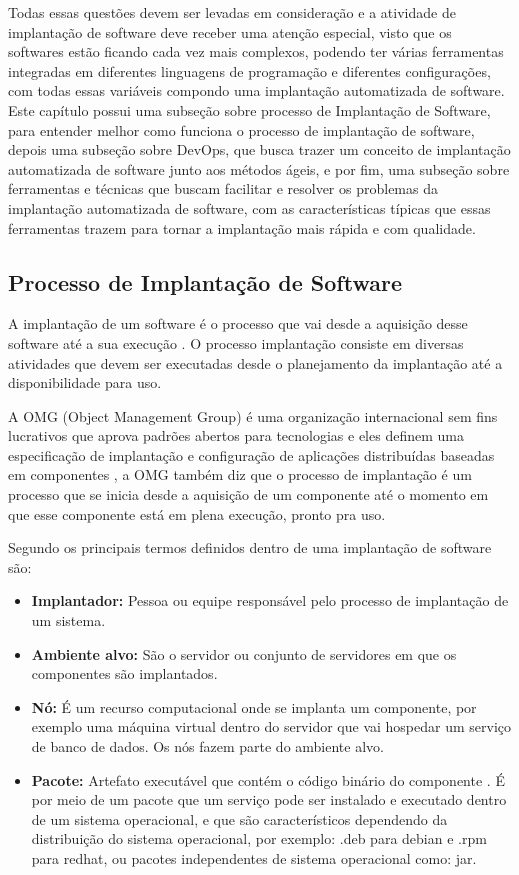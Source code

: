 Todas essas questões devem ser levadas em consideração e a atividade de implantação de
software deve receber uma atenção especial, visto que os softwares estão ficando
cada vez mais complexos, podendo ter várias ferramentas integradas em diferentes
linguagens de programação e diferentes configurações, com todas essas variáveis compondo
uma implantação automatizada de software. Este capítulo possui uma subseção sobre
processo de Implantação de Software, para entender melhor como funciona o processo de implantação
de software, depois uma subseção sobre DevOps, que busca trazer um conceito de implantação
automatizada de software junto aos métodos ágeis, e por fim, uma subseção sobre
ferramentas e técnicas que buscam facilitar e resolver os problemas da
implantação automatizada de software, com as características típicas que essas
ferramentas trazem para tornar a implantação mais rápida e com qualidade.

\subsection{Processo de Implantação de Software}

A implantação de um software é o processo que vai desde a aquisição desse software
até a sua execução \cite{leo2014}. O processo implantação consiste em diversas
atividades que devem ser executadas desde o planejamento da implantação até a
disponibilidade para uso.

A OMG (Object Management Group) é uma organização internacional sem fins lucrativos
que aprova padrões abertos para tecnologias e eles definem uma especificação de
implantação e configuração de aplicações distribuídas baseadas em componentes \cite{omg2006},
a OMG também diz que o processo de implantação é um processo que se inicia desde
a aquisição de um componente até o momento em que esse componente está em plena
execução, pronto pra uso.

Segundo \cite{omg2006} os principais termos definidos dentro de uma implantação
de software são:

\begin{itemize}
  \item  \textbf{Implantador:} Pessoa ou equipe responsável pelo processo de
  implantação  de um sistema.
  \item  \textbf{Ambiente alvo:} São o servidor ou conjunto de servidores em
  que os componentes são implantados.
  \item  \textbf{Nó:} É um recurso computacional onde se implanta um componente,
  por exemplo uma máquina virtual dentro do servidor que vai hospedar um serviço
  de banco de dados. Os nós fazem parte do ambiente alvo.
  \item  \textbf{Pacote:} Artefato executável que contém o código binário do componente
  . É por meio de um pacote que um serviço pode ser instalado e executado dentro
  de um sistema operacional, e que são característicos dependendo da distribuição
  do sistema operacional, por exemplo: .deb para debian e .rpm para redhat, ou
  pacotes independentes de sistema operacional como: jar.
\end{itemize}

